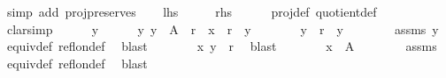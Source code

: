 \begin{isabellebody}
\ {\isacharparenleft}{\kern0pt}simp\ add{\isacharcolon}{\kern0pt}\ proj{\isacharunderscore}{\kern0pt}preserves{\isacharparenright}{\kern0pt}\isanewline
{}\isamarkupfalse%
\isanewline
\ \ \isamarkupfalse%
\ {\isacharquery}{\kern0pt}lhs\isanewline
\ \ \isamarkupfalse%
\ \isamarkupfalse%
\ {\isacharquery}{\kern0pt}rhs\isanewline
\ \ \ \ \isamarkupfalse%
\ proj{\isacharunderscore}{\kern0pt}def\ quotient{\isacharunderscore}{\kern0pt}def\isanewline
\ \ \isamarkupfalse%
\ clarsimp\isanewline
\ \ \ \ \isamarkupfalse%
\ y\isanewline
\ \ \ \ \isamarkupfalse%
\ y{\isacharcolon}{\kern0pt}\ {\isachardoublequoteopen}y\ {\isasymin}\ A{\isachardoublequoteclose}\ \ {\isachardoublequoteopen}r\ {\isacharbackquote}{\kern0pt}{\isacharbackquote}{\kern0pt}\ {\isacharbraceleft}{\kern0pt}x{\isacharbraceright}{\kern0pt}\ {\isacharequal}{\kern0pt}\ r\ {\isacharbackquote}{\kern0pt}{\isacharbackquote}{\kern0pt}\ {\isacharbraceleft}{\kern0pt}y{\isacharbraceright}{\kern0pt}{\isachardoublequoteclose}\isanewline
\ \ \ \ \isamarkupfalse%
\ \isamarkupfalse%
\ {\isachardoublequoteopen}y\ {\isasymin}\ r\ {\isacharbackquote}{\kern0pt}{\isacharbackquote}{\kern0pt}\ {\isacharbraceleft}{\kern0pt}y{\isacharbraceright}{\kern0pt}{\isachardoublequoteclose}\isanewline
\ \ \ \ \ \ \isamarkupfalse%
\ assms\ y\ \isamarkupfalse%
\ equiv{\isacharunderscore}{\kern0pt}def\ refl{\isacharunderscore}{\kern0pt}on{\isacharunderscore}{\kern0pt}def\ \isamarkupfalse%
\ blast\isanewline
\ \ \ \ \isamarkupfalse%
\ \isamarkupfalse%
\ {\isachardoublequoteopen}{\isacharparenleft}{\kern0pt}x{\isacharcomma}{\kern0pt}\ y{\isacharparenright}{\kern0pt}\ {\isasymin}\ r{\isachardoublequoteclose}\ \isamarkupfalse%
\ blast\isanewline
\ \ \ \ \isamarkupfalse%
\ \isamarkupfalse%
\ {\isachardoublequoteopen}x\ {\isasymin}\ A{\isachardoublequoteclose}\isanewline
\ \ \ \ \ \ \isamarkupfalse%
\ assms\ \isamarkupfalse%
\ equiv{\isacharunderscore}{\kern0pt}def\ refl{\isacharunderscore}{\kern0pt}on{\isacharunderscore}{\kern0pt}def\ \isamarkupfalse%
\ blast\isanewline
\ \ \isamarkupfalse%
\isanewline
{}\isamarkupfalse%
%
\endisatagproof
{\isafoldproof}%
%
\isadelimproof
\isanewline
%
\endisadelimproof
\isanewline
{}\isamarkupfalse%

\end{isabellebody}
